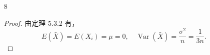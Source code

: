 \documentclass[normal,founder,mtpro2,cn]{elegantnote}
\begin{document}
\begin{enumerate}
\begin{proof}
            样本 $B$ 的极差 $R_{B}$：
            \begin{equation*}
                R_{B}=y_{(n)}-y_{(1)}=a x_{(n)}+b-a x_{(1)}-b=a\left[x_{(n)}-x_{(1)}\right]=a R_{A}
            \end{equation*}
    
            样本 $B$ 的中位数 ${m_{0.5}}_{B}$：

            \begin{enumerate}
                \item 当 $n$ 为偶数时，
                \begin{equation*}
                    {m_{0.5}}_{B}=y_{\left(\frac{n+1}{2}\right)}=a x_{\left(\frac{n+1}{2}\right)}+b=a{m_{0.5}}_{A}+b
                \end{equation*}
                \item 当 $n$ 为奇数时，
                \begin{equation*}
                    \begin{aligned}
                        {m_{0.5}}_{B}=&\frac{1}{2}\left[y_{\left(\frac{n}{2}\right)}+y_{\left(\frac{n}{2}+1\right)}\right]=\frac{1}{2}\left[a x_{\left(\frac{n}{2}\right)}+b+a x_{\left(\frac{n}{2}+1\right)}+b\right] \\
                        =&\frac{a}{2}\left[x_{\left(\frac{n}{2}\right)}+x_{\left(\frac{n}{2}+1\right)}\right]+b=a {m_{0.5}}_A+b\\
                    \end{aligned}
                \end{equation*}
            \end{enumerate}

            因此，样本 $B$ 的中位数 ${m_{0.5}}_{B}$ 为
            \begin{equation*}
                {m_{0.5}}_{B}=a{m_{0.5}}_{A}+b.
            \end{equation*}
        \end{proof}
    
        \item[8] 
        \begin{proof}
            由定理 5.3.2 有，
            \begin{equation*}
                E(\bar{X})=E(X_i)=\mu=0,\quad \operatorname{Var}(\bar{X})=\frac{\sigma^2}{n}=\frac{1}{3n}.
            \end{equation*}
        \end{proof}
    

\end{enumerate}
\end{document}
